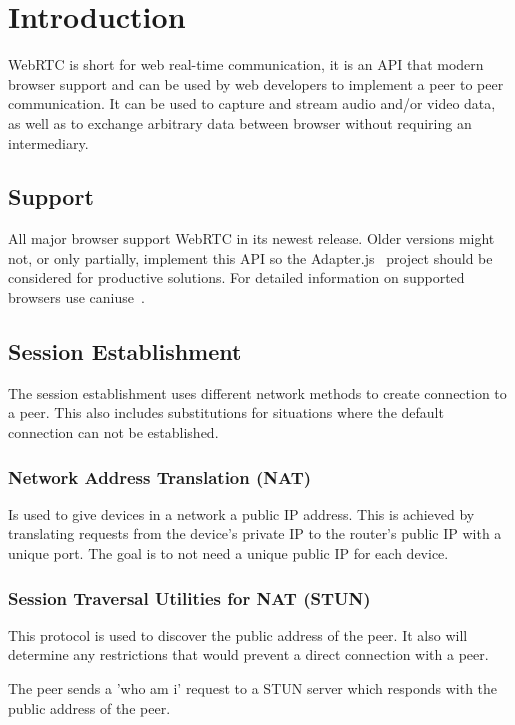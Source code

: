 \clearpage
\chapter{Introduction}
WebRTC is short for web real-time communication, it is an API that modern browser support and can be used by web developers to implement a peer to peer communication. It can be used to capture and stream audio and/or video data, as well as to exchange arbitrary data between browser without requiring an intermediary.

\section{Support}
All major browser support WebRTC in its newest release. Older versions might not, or only partially, implement this API so the Adapter.js~\autocite{adapterjs} project should be considered for productive solutions. For detailed information on supported browsers use caniuse~\autocite{caniuse}.

\section{Session Establishment}
The session establishment uses different network methods to create connection to a peer. This also includes substitutions for situations where the default connection can not be established.

\subsection{Network Address Translation (NAT)}
Is used to give devices in a network a public IP address. This is achieved by translating requests from the device's private IP to the router's public IP with a unique port. The goal is to not need a unique public IP for each device.

\subsection{Session Traversal Utilities for NAT (STUN)}
This protocol is used to discover the public address of the peer. It also will determine any restrictions that would prevent a direct connection with a peer.

The peer sends a 'who am i' request to a STUN server which responds with the public address of the peer.

